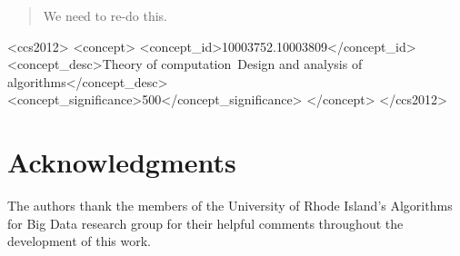 \documentclass[acmsmall, review]{acmart}
\begin{document}
\begin{abstract}

  We need to re-do this. 
\end{abstract}

\begin{CCSXML}
<ccs2012>
   <concept>
       <concept_id>10003752.10003809</concept_id>
       <concept_desc>Theory of computation~Design and analysis of algorithms</concept_desc>
       <concept_significance>500</concept_significance>
       </concept>
 </ccs2012>
\end{CCSXML}


\maketitle

    
    
    
    
    

    \section*{Acknowledgments}
    The authors thank the members of the University of Rhode Island's Algorithms for Big Data research group for their helpful comments throughout the development of this work.

    \FloatBarrier
    
    
\end{document}

